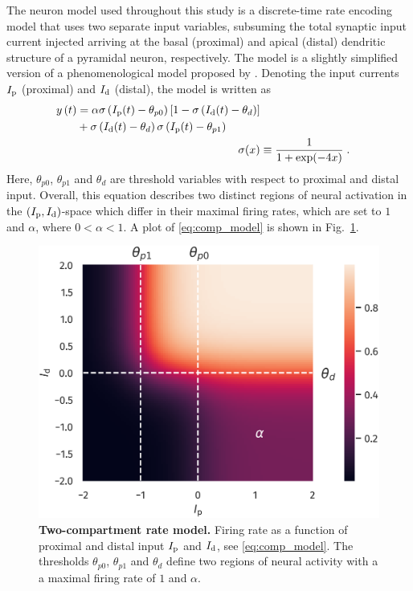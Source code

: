 \documentclass[utf8]{frontiersSCNS} %
\begin{document}
The neuron model used throughout this study is a discrete-time 
rate encoding model that uses two separate input variables, 
subsuming the total synaptic input current injected arriving 
at the basal (proximal) and apical (distal) 
dendritic structure of a pyramidal neuron, respectively. 
The model is a slightly simplified version of a phenomenological 
model proposed by \citet{Shai_2015}. Denoting the input currents 
$I_{\rm p}$ (proximal) and $I_{\rm d}$ (distal), 
the model is written as
\begin{align}
\begin{split}
y\left(t\right) &= \alpha  \sigma\left( I_{\rm p}(t) - \theta_{p0} \right)
\left[1-\sigma\left(I_{\rm d}(t) - \theta_d\right)\right] \\
&+ \sigma\left(I_{\rm d}(t) - \theta_d \right)
\sigma\left( I_{\rm p}(t) - \theta_{p1} \right)
\end{split} \label{eq:comp_model}\\
\sigma(x) &\equiv \frac{1}{1+\exp(-4x)} \; .
\end{align}
Here, $\theta_{p0}$, $\theta_{p1}$ and $\theta_d$ are threshold 
variables with respect to proximal and distal input. 
Overall, this equation describes two distinct
regions of neural activation in the 
$(I_{\rm p}, I_{\rm d})$-space which differ in their
maximal firing rates, which are set to $1$ and 
$\alpha$, where $0 < \alpha < 1$.
A plot of \eqref{eq:comp_model} is shown in Fig.~\ref{fig:comp_model}.
\begin{figure}
\centering
\includegraphics[width=0.6\columnwidth]{plot_comp_mod_marks.png}
\caption{{\bf Two-compartment rate model.} Firing rate as a
	function of proximal and distal input $I_{\rm p}$ and $I_{\rm d}$, 
	see \eqref{eq:comp_model}. 
	The thresholds $\theta_{p0}$, $\theta_{p1}$ and $\theta_d$ define
	two regions of neural activity with a a maximal firing rate of $1$
	and $\alpha$.}
\label{fig:comp_model}
\end{figure}
\end{document}
